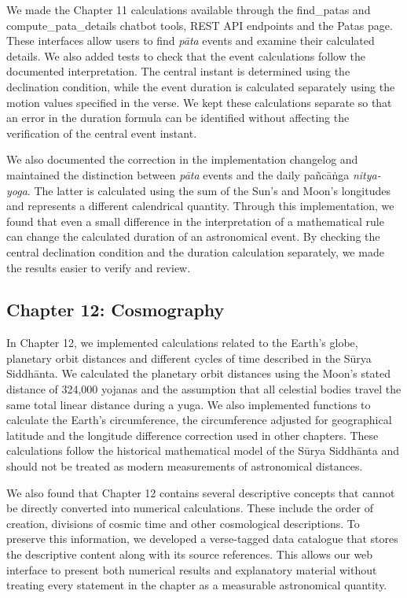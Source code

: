 \documentclass[12pt,a4paper,oneside]{report}
\newcommand{\surya}{Sūrya Siddhānta\xspace}
\begin{document}
We made the Chapter 11 calculations available through the find\_patas and compute\_pata\_details chatbot tools, REST API endpoints and the Patas page. These interfaces allow users to find \emph{pāta} events and examine their calculated details. We also added tests to check that the event calculations follow the documented interpretation. The central instant is determined using the declination condition, while the event duration is calculated separately using the motion values specified in the verse. We kept these calculations separate so that an error in the duration formula can be identified without affecting the verification of the central event instant.

We also documented the correction in the implementation changelog and maintained the distinction between \emph{pāta} events and the daily pañcāṅga \emph{nitya-yoga}. The latter is calculated using the sum of the Sun's and Moon's longitudes and represents a different calendrical quantity. Through this implementation, we found that even a small difference in the interpretation of a mathematical rule can change the calculated duration of an astronomical event. By checking the central declination condition and the duration calculation separately, we made the results easier to verify and review.

\subsection{Chapter 12: Cosmography}

In Chapter 12, we implemented calculations related to the Earth's globe, planetary orbit distances and different cycles of time described in the \surya. We calculated the planetary orbit distances using the Moon's stated distance of 324,000 yojanas and the assumption that all celestial bodies travel the same total linear distance during a yuga. We also implemented functions to calculate the Earth's circumference, the circumference adjusted for geographical latitude and the longitude difference correction used in other chapters. These calculations follow the historical mathematical model of the \surya and should not be treated as modern measurements of astronomical distances.

We also found that Chapter 12 contains several descriptive concepts that cannot be directly converted into numerical calculations. These include the order of creation, divisions of cosmic time and other cosmological descriptions. To preserve this information, we developed a verse-tagged data catalogue that stores the descriptive content along with its source references. This allows our web interface to present both numerical results and explanatory material without treating every statement in the chapter as a measurable astronomical quantity.
\end{document}
